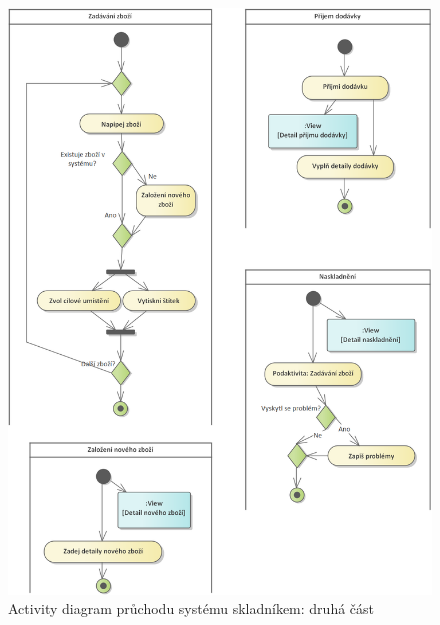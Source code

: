 \begin{figure}[]
\includegraphics[width=\textwidth]{../png/diagrams/ac2.png}
\caption{Activity diagram průchodu systému skladníkem: druhá část} \label{picture:storekeeper2}
\end{figure}

